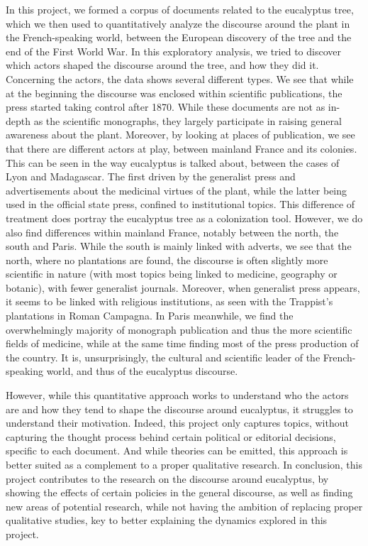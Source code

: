 

In this project, we formed a corpus of documents related to the eucalyptus tree, which we then used to quantitatively analyze the discourse around the plant in the French-speaking world, between the European discovery of the tree and the end of the First World War. In this exploratory analysis, we tried to discover which actors shaped the discourse around the tree, and how they did it. Concerning the actors, the data shows several different types. We see that while at the beginning the discourse was enclosed within scientific publications, the press started taking control after 1870. While these documents are not as in-depth as the scientific monographs, they largely participate in raising general awareness about the plant. Moreover, by looking at places of publication, we see that there are different actors at play, between mainland France and its colonies. This can be seen in the way eucalyptus is talked about, between the cases of Lyon and Madagascar. The first driven by the generalist press and advertisements about the medicinal virtues of the plant, while the latter being used in the official state press, confined to institutional topics. This difference of treatment does portray the eucalyptus tree as a colonization tool. However, we do also find differences within mainland France, notably between the north, the south and Paris. While the south is mainly linked with adverts, we see that the north, where no plantations are found, the discourse is often slightly more scientific in nature (with most topics being linked to medicine, geography or botanic), with fewer generalist journals. Moreover, when generalist press appears, it seems to be linked with religious institutions, as seen with the Trappist's plantations in Roman Campagna. In Paris meanwhile, we find the overwhelmingly majority of monograph publication and thus the more scientific fields of medicine, while at the same time finding most of the press production of the country. It is, unsurprisingly, the cultural and scientific leader of the French-speaking world, and thus of the eucalyptus discourse.

However, while this quantitative approach works to understand who the actors are and how they tend to shape the discourse around eucalyptus, it struggles to understand their motivation. Indeed, this project only captures topics, without capturing the thought process behind certain political or editorial decisions, specific to each document. And while theories can be emitted, this approach is better suited as a complement to a proper qualitative research. In conclusion, this project contributes to the research on the discourse around eucalyptus, by showing the effects of certain policies in the general discourse, as well as finding new areas of potential research, while not having the ambition of replacing proper qualitative studies, key to better explaining the dynamics explored in this project.
